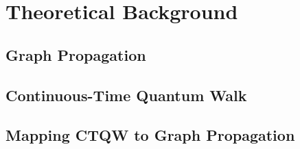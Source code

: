 \section{Theoretical Background}
\label{sec:background}

\subsection{Graph Propagation}

\subsection{Continuous-Time Quantum Walk}

\subsection{Mapping CTQW to Graph Propagation}
